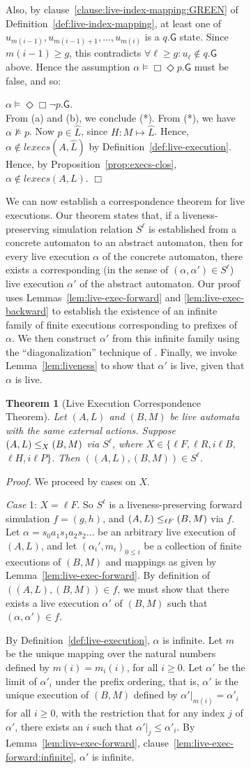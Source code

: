 \documentclass[11pt]{article}
\newcommand{\bt}{\begin{theorem}}
\newcommand{\et}{\end{theorem}}
\newcommand{\bpr}{\begin{proof}}
\newcommand{\epr}{\end{proof}}
\newcommand{\bleqn}[1]{\begin{centlabeqn}{#1}}
\newcommand{\eleqn}{\end{centlabeqn}}
\renewcommand{\ss}{\smallskip}
\newenvironment{centlabeqn}[1]		{\sbox{\EqnLabel}{#1}
    {\ss\\ \hspace*{\fill}}
   } 
   {\hfill{\makebox[0in][r]{\usebox{\EqnLabel}}}\ms\\}
\newcommand{\fa}{\forall}
\renewcommand{\l}{\ell}
\newcommand{\sat}{\models}
\newcommand{\G}{\mathsf{G}}
\newcommand{\al}{\alpha}
\newcommand{\clos}[1]{\widehat{{#1}}}	\newcommand{\esig}{\mathit{esig}}
\newcommand{\execs}{\mathit{lexecs}}
\newcommand{\ea}{\Diamond \Box}
\newcommand{\iof}{\Box \Diamond}
\newtheorem{theorem}{Theorem}
\newcommand{\case}[2]{\vspace{1.5ex} \noindent \textit{Case} #1: #2.}
\newcommand{\ms}[1]{\relax\ifmmode
                \mathord{\mathcode`\-="702D\it #1\mathcode`\-="2200}\else
{\it #1}\fi
}
\newenvironment{proof}{\vspace{-1.0ex}\textit{Proof.} }
                      {\hfill{$\Box$}}
\begin{document}
\begin{figure}[htb]
\begin{figure}[htb]
Also, by clause~\ref{clause:live-index-mapping:GREEN} of 
Definition~\ref{def:live-index-mapping},
at least one of $u_{m(i-1)}, u_{m(i-1)+1}, \ldots, u_{m(i)}$ is a $q.\G$ state. 
Since $m(i-1) \geq g$, this contradicts
$\fa \l \geq g : u_\l \not\in q.\G$
above. Hence the assumption $\alpha \sat \iof p.\G$ must be false, and so:
\bleqn{(b)}
	$\alpha \sat \ea \neg p.\G$.
\eleqn
From (a) and (b), we conclude (*). From (*), we have $\al \not\sat p$.
Now $p \in \clos{L}$, since $H: M \mapsto \clos{L}$.
Hence, $\al \not\in \execs(A,\clos{L})$ by Definition~\ref{def:live-execution}.
Hence, by Proposition~\ref{prop:execs-clos}, $\al \not\in \execs(A,{L})$.
\epr


We can now establish a correspondence theorem for live executions. Our theorem
states that, if a liveness-preserving simulation relation $S^\l$ is established from
a concrete automaton to an abstract automaton, then for every live execution
$\al$ of the concrete automaton, there exists a corresponding (in the sense of
$(\al,\al') \in S^\l$) live execution $\al'$ of the abstract automaton. Our proof
uses Lemmas~\ref{lem:live-exec-forward} and \ref{lem:live-exec-backward}
to establish the existence of an infinite
family of finite executions corresponding to prefixes of $\al$. We then construct
$\al'$ from this infinite family using the ``diagonalization'' technique of
\cite{GSSL93}. 
Finally, we invoke Lemma~\ref{lem:liveness} to show that $\al'$
is live, given that $\al$ is live.



\bt [Live Execution Correspondence Theorem]
Let $(A,L)$ and $(B,M)$ be live automata with the same external actions.
Suppose $(A,L) \leq_X (B,M)$ via $S^\l$, where 
$X \in \{\l F, \l R, i\l B,$ $\l H, i\l P\}$.
Then $((A,L),(B,M)) \in S^\l$.
\label{thm:live execution correspondence}
\et
\bpr
We proceed by cases on $X$.

\case{1}{$X = \l F$} So $S^\l$ is a liveness-preserving forward simulation 
$f = (g,h)$, and $(A,L) \lpfs (B,M)$ via $f$.
Let $\al = s_0 a_1 s_1 a_2 s_2 \ldots$ be an arbitrary live execution
of $(A,L)$, and let $(\al_i', m_i)_{0 \leq i}$ be a
collection of finite executions of $(B,M)$ and mappings
as given by Lemma~\ref{lem:live-exec-forward}.
By definition of $((A,L),(B,M)) \in f$, we
must show that there exists a live execution $\al'$ of $(B,M)$ such that
$(\al,\al') \in f$.

By Definition~\ref{def:live-execution}, $\al$ is infinite.
Let $m$ be the unique mapping over the natural
numbers defined by $m(i) = m_i(i)$, for all $i \geq 0$. Let $\al'$ be the limit of
$\al'_i$ under the prefix ordering, that is, $\al'$ is the unique execution of
$(B,M)$ defined by $\al' |_{m(i)} = \al'_i$ for all $i \ge 0$,
with the restriction that for any
index $j$ of $\al'$, there exists an $i$ such that $\al'|_j \leq
\al'_i$. By Lemma~\ref{lem:live-exec-forward},
clause~\ref{lem:live-exec-forward:infinite}, $\al'$ is infinite.



\end{figure}
\end{figure}
\end{document}
